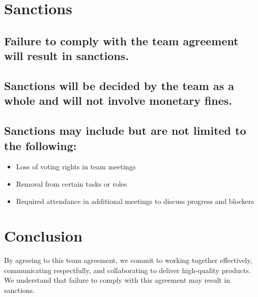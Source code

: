 \documentclass{article}
\begin{document}
\section{Sanctions}

\subsection{Failure to comply with the team agreement will result in sanctions.}
\subsection{Sanctions will be decided by the team as a whole and will not involve monetary fines.}
\subsection{Sanctions may include but are not limited to the following:}
\begin{itemize}
    \item Loss of voting rights in team meetings
    \item Removal from certain tasks or roles
    \item Required attendance in additional meetings to discuss progress and blockers
\end{itemize}

\section{Conclusion}

By agreeing to this team agreement, we commit to working together effectively, communicating respectfully, and collaborating to deliver high-quality products. We understand that failure to comply with this agreement may result in sanctions.
\end{document}
